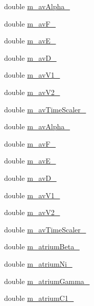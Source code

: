 \begin{DoxyCompactItemize}
double \hyperlink{classatrial_parameters_a3f320a4f3f0079607c922c66f9c8a1dc}{m\+\_\+av\+Alpha\+\_}
\item 
double \hyperlink{classatrial_parameters_ab758dfcc5335318f8d06d8eea9296417}{m\+\_\+av\+F\+\_}
\item 
double \hyperlink{classatrial_parameters_a2c2c020d5f93eed0d499825c4255f8a7}{m\+\_\+av\+E\+\_}
\item 
double \hyperlink{classatrial_parameters_ab1414e1c2ca960d310494cbcbb9d2c16}{m\+\_\+av\+D\+\_}
\item 
double \hyperlink{classatrial_parameters_aceeac17e4d013b68ea8420eda4dd1a4f}{m\+\_\+av\+V1\+\_}
\item 
double \hyperlink{classatrial_parameters_a0fbaac1d76d9d3f484605f963db6c9ae}{m\+\_\+av\+V2\+\_}
\item 
double \hyperlink{classatrial_parameters_a5a28144680a84c5f08d15d43f8d34080}{m\+\_\+av\+Time\+Scaler\+\_}
\item 
double \hyperlink{classatrial_parameters_a50517d9e60f1b3e94d1ec7d8e1f9c761}{m\+\_\+av\+Alpha\+\_}
\item 
double \hyperlink{classatrial_parameters_af5e7130703f14fb8b42afabaaaaed254}{m\+\_\+av\+F\+\_}
\item 
double \hyperlink{classatrial_parameters_acf92b8e93c898440847f9190f76d9cd8}{m\+\_\+av\+E\+\_}
\item 
double \hyperlink{classatrial_parameters_ac12594b53032518ce559539a91614d0d}{m\+\_\+av\+D\+\_}
\item 
double \hyperlink{classatrial_parameters_a8b2c683b744f453bacf4f7174ffcad96}{m\+\_\+av\+V1\+\_}
\item 
double \hyperlink{classatrial_parameters_ab5eaefafc5cb1480a97c5e46936686a2}{m\+\_\+av\+V2\+\_}
\item 
double \hyperlink{classatrial_parameters_aaadccdb510f197afeecfaefa1da4e532}{m\+\_\+av\+Time\+Scaler\+\_}
\item 
double \hyperlink{classatrial_parameters_a7c343526d6d0a56f6dabe4ce867c5810}{m\+\_\+atrium\+Beta\+\_}
\item 
double \hyperlink{classatrial_parameters_a264d87df8602f1f620ca61087905dbe8}{m\+\_\+atrium\+Ni\+\_}
\item 
double \hyperlink{classatrial_parameters_a091e54d1f2dc5cf5b198b2bc1a937513}{m\+\_\+atrium\+Gamma\+\_}
\item 
double \hyperlink{classatrial_parameters_aa9be0fd47e2f83aaeb118666ec7dae7c}{m\+\_\+atrium\+C1\+\_}

\end{DoxyCompactItemize}
